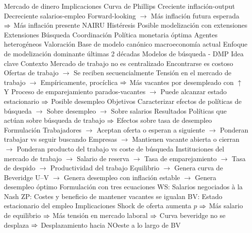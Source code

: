 \documentclass{nuevotema}
\begin{document}
\begin{esquemal}
				\4[MP] Mercado de dinero
				\4[] 
			\3 Implicaciones
				\4 Curva de Phillips
				\4[] Creciente inflación-output
				\4[] Decreciente salarios-empleo
				\4[] Forward-looking
				\4[] $\to$ Más inflación futura esperada
				\4[] $\Rightarrow$ Más inflación presente
				\4 NAIRU
				\4[]
				\4 Histéresis
				\4[] Posible modelización con extensiones
			\3 Extensiones
				\4 Búsqueda
				\4 Coordinación
				\4 Política monetaria óptima
				\4 Agentes heterogéneos
			\3 Valoración
				\4 Base de modelo canónico macroeconomía actual
				\4 Enfoque de modelización dominante últimas 2 décadas
		\2 Modelos de búsqueda - DMP
			\3 Idea clave
				\4 Contexto
				\4[] Mercado de trabajo no es centralizado
				\4[] Encontrarse es costoso
				\4[] Ofertas de trabajo
				\4[] $\to$ Se reciben secuencialmente
				\4[] Tensión en el mercado de trabajo
				\4[] $\to$ Empíricamente, procíclica
				\4[] $\Rightarrow$ Más vacantes por desempleado con $\uparrow$ Y
				\4[] Proceso de emparejamiento parados-vacantes
				\4[] $\to$ Puede alcanzar estado estacionario
				\4[] $\Rightarrow$ Posible desempleo
				\4 Objetivos
				\4[] Caracterizar efectos de políticas de búsqueda
				\4[] $\to$ Sobre desempleo
				\4[] $\to$ Sobre salarios
				\4 Resultados
				\4[] Políticas que actúan sobre búsqueda de trabajo
				\4[] $\Rightarrow$ Efectos sobre tasa de desempleo
			\3 Formulación
				\4[] Trabajadores
				\4[] $\to$ Aceptan oferta o esperan a siguiente
				\4[] $\to$ Ponderan trabajar vs seguir buscando
				\4[] Empresas
				\4[] $\to$ Mantienen vacante abierta o cierran
				\4[] $\to$ Ponderan producto del trabajo vs coste de búsqueda
				\4[] Instituciones del mercado de trabajo
				\4[] $\to$ Salario de reserva
				\4[] $\to$ Tasa de emparejamiento
				\4[] $\to$ Tasa de despido
				\4[] $\to$ Productividad del trabajo
				\4[] Equilibrio
				\4[] $\to$ Genera curva de Beveridge U--V
				\4[] $\to$ Genera desempleo con inflación estable
				\4[] $\to$ Genera desempleo óptimo
				\4[] Formulación con tres ecuaciones
				\4[] WS: Salarios negociados à la Nash
				\4[] 
				\4[] ZP: Costes y beneficio de mantener vacantes se igualan
				\4[] 
				\4[] BV: Estado estacionario del empleo
				\4[] 
			\3 Implicaciones
				\4 Shock de oferta aumenta $p$
				\4[] $\Rightarrow$ Más salario de equilibrio
				\4[] $\Rightarrow$ Más tensión en mercado laboral
				\4[] $\Rightarrow$ Curva beveridge no se desplaza
				\4[] $\Rightarrow$ Desplazamiento hacia NOeste a lo largo de BV

\end{esquemal}
\end{document}
